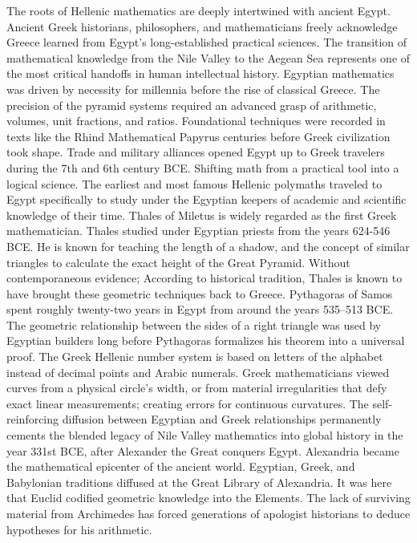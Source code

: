 The roots of Hellenic mathematics are deeply intertwined with ancient Egypt. Ancient Greek historians, philosophers, and mathematicians freely acknowledge Greece learned from Egypt's long-established practical sciences. The transition of mathematical knowledge from the Nile Valley to the Aegean Sea represents one of the most critical handoffs in human intellectual history. Egyptian mathematics was driven by necessity for millennia before the rise of classical Greece. The precision of the pyramid systems required an advanced grasp of arithmetic, volumes, unit fractions, and ratios. Foundational techniques were recorded in texts like the Rhind Mathematical Papyrus centuries before Greek civilization took shape. Trade and military alliances opened Egypt up to Greek travelers during the 7th and 6th century BCE. Shifting math from a practical tool into a logical science.
The earliest and most famous Hellenic polymaths traveled to Egypt specifically to study under the Egyptian keepers of academic and scientific knowledge of their time. Thales of Miletus is widely regarded as the first Greek mathematician. Thales studied under Egyptian priests from the years 624-546 BCE. He is known for teaching the length of a shadow, and the concept of similar triangles to calculate the exact height of the Great Pyramid. Without contemporaneous evidence; According to historical tradition, Thales is known to have brought these geometric techniques back to Greece. Pythagoras of Samos spent roughly twenty-two years in Egypt from around the years 535–513 BCE. The geometric relationship between the sides of a right triangle was used by Egyptian builders long before Pythagoras formalizes his theorem into a universal proof. The Greek Hellenic number system is based on letters of the alphabet instead of decimal points and Arabic numerals. 
Greek mathematicians viewed curves from a physical circle’s width, or from material irregularities that defy exact linear measurements; creating errors for continuous curvatures. The self-reinforcing diffusion between Egyptian and Greek relationships permanently cements the blended legacy of Nile Valley mathematics into global history in the year 331st BCE, after Alexander the Great conquers Egypt. Alexandria became the mathematical epicenter of the ancient world. Egyptian, Greek, and Babylonian traditions diffused at the Great Library of Alexandria. It was here that Euclid codified geometric knowledge into the Elements. The lack of surviving material from Archimedes has forced generations of apologist historians to deduce hypotheses for his arithmetic. 
